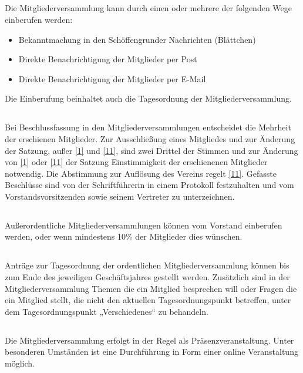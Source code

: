 	
	\subsection{}
	Die Mitgliederversammlung kann durch einen oder mehrere der folgenden Wege einberufen werden:
		\begin{itemize}
			\item Bekanntmachung in den Schöffengrunder Nachrichten (Blättchen)
			\item Direkte Benachrichtigung der Mitglieder per Post
			\item Direkte Benachrichtigung der Mitglieder per E-Mail
		\end{itemize}
	Die Einberufung beinhaltet auch die Tagesordnung der Mitgliederversammlung.
	
	\subsection{} Bei Beschlussfassung in den Mitgliederversammlungen entscheidet die Mehrheit der erschienen Mitglieder. Zur Ausschließung eines Mitgliedes und zur Änderung der Satzung, außer \ref{1} und \ref{11}, sind zwei Drittel der Stimmen und zur Änderung von \ref{1} oder \ref{11} der Satzung Einstimmigkeit der erschienenen Mitglieder notwendig. Die Abstimmung zur Auflösung des Vereins regelt \ref{11}. Gefasste Beschlüsse sind von der Schriftführerin in einem Protokoll festzuhalten und vom Vorstandsvorsitzenden sowie seinem Vertreter zu unterzeichnen.
	
	\subsection{} Außerordentliche Mitgliederversammlungen können vom Vorstand einberufen werden, oder wenn mindestens 10\% der Mitglieder dies wünschen.
	
	\subsection{} Anträge zur Tagesordnung der ordentlichen Mitgliederversammlung können  
	bis zum Ende des jeweiligen Geschäftsjahres gestellt werden. Zusätzlich sind in der Mitgliederversammlung Themen die ein Mitglied besprechen will oder Fragen die ein Mitglied stellt, die nicht den aktuellen Tagesordnungspunkt betreffen, unter dem Tagesordnungspunkt „Verschiedenes“ zu behandeln.

	\subsection{} Die Mitgliederversammlung erfolgt in der Regel als Präsenzveranstaltung. Unter besonderen Umständen ist eine Durchführung in Form einer online Veranstaltung möglich.
	
